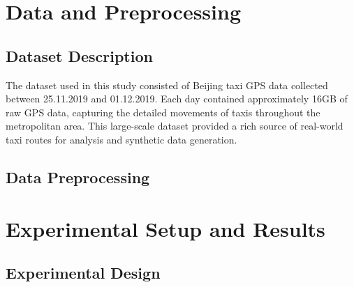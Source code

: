 \documentclass[runningheads]{llncs}
\begin{document}
\begin{compactoutline}
\end{compactoutline}

\section{Data and Preprocessing}
\label{sec:data-preprocessing}

\subsection{Dataset Description}
\label{sec:data}

The dataset used in this study consisted of Beijing taxi GPS data collected between 25.11.2019 and 01.12.2019. Each day contained approximately 16GB of raw GPS data, capturing the detailed movements of taxis throughout the metropolitan area. This large-scale dataset provided a rich source of real-world taxi routes for analysis and synthetic data generation.

\subsection{Data Preprocessing}
\label{sec:preprocessing}

\begin{compactoutline}
\end{compactoutline}

\section{Experimental Setup and Results}
\label{sec:evaluation}

\subsection{Experimental Design}
\label{sec:exp-design}

\begin{compactoutline}
\end{compactoutline}
\end{document}
